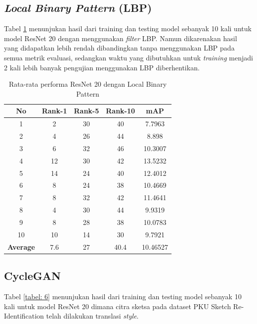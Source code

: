 \subsection{\textit{Local Binary Pattern} (LBP)}

Tabel \ref{tabel: 5} menunjukan hasil dari training dan testing model sebanyak 10 kali untuk model ResNet 20 dengan menggunakan \textit{filter} LBP. Namun dikarenakan hasil yang didapatkan lebih rendah dibandingkan tanpa menggunakan LBP pada semua metrik evaluasi, sedangkan waktu yang dibutuhkan untuk \textit{training} menjadi 2 kali lebih banyak pengujian menggunakan LBP diberhentikan.

\begin{longtable}{|c|c|c|c|c|}
	\caption{Rata-rata performa ResNet 20 dengan Local Binary Pattern}
	\label{tabel: 5}\\
	\hline
	\rowcolor[HTML]{C0C0C0}
	\textbf{No} &\textbf{Rank-1} & \textbf{Rank-5} & \textbf{Rank-10} & \textbf{mAP} \\
	\hline
	1 & 2 & 30 & 40 & 7.7963\\
	2 & 4 & 26 & 44 & 8.898\\
	3 & 6 & 32 & 46 & 10.3007\\
	4 & 12 & 30 & 42 & 13.5232\\
	5 & 14 & 24 & 40 & 12.4012\\
	6 & 8 & 24 & 38 & 10.4669\\
	7 & 8 & 32 & 42 & 11.4641\\
	8 & 4 & 30 & 44 & 9.9319\\
	9 & 8 & 28 & 38 & 10.0783\\
	10 & 10 & 14 & 30 & 9.7921\\
	\hline
	\textbf{Average} & 7.6 & 27 & 40.4 & 10.46527\\
	\hline
\end{longtable}

\subsection{CycleGAN}

Tabel \ref{tabel: 6} menunjukan hasil dari training dan testing model sebanyak 10 kali untuk model ResNet 20 dimana citra sketsa pada dataset PKU Sketch Re-Identification telah dilakukan translasi \textit{style}.

